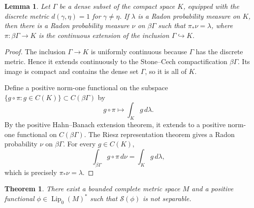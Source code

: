 \documentclass[11pt]{article}
\newtheorem{theorem}{Theorem}
\newtheorem{lemma}{Lemma}
\DeclareMathOperator{\Lip}{Lip}
\newcommand{\SM}{\mathcal S}
\begin{document}
\begin{lemma}\label{lem:lift}
Let \(\Gamma\) be a dense subset of the compact space \(K\), equipped with the
discrete metric \(d(\gamma,\eta)=1\) for \(\gamma\ne\eta\).  If
\(\lambda\) is a Radon probability measure on \(K\), then there is a Radon
probability measure \(\nu\) on \(\beta\Gamma\) such that
\(\pi_*\nu=\lambda\), where
\(\pi:\beta\Gamma\to K\) is the continuous extension of the inclusion
\(\Gamma\hookrightarrow K\).
\end{lemma}

\begin{proof}
The inclusion \(\Gamma\to K\) is uniformly continuous because \(\Gamma\) has
the discrete metric.  Hence it extends continuously to the Stone--Cech
compactification \(\beta\Gamma\).  Its image is compact and contains the dense
set \(\Gamma\), so it is all of \(K\).

Define a positive norm-one functional on the subspace
\(\{g\circ\pi:g\in C(K)\}\subset C(\beta\Gamma)\) by
\[
        g\circ\pi\longmapsto \int_K g\,d\lambda .
\]
By the positive Hahn--Banach extension theorem, it extends to a positive
norm-one functional on \(C(\beta\Gamma)\).  The Riesz representation theorem
gives a Radon probability \(\nu\) on \(\beta\Gamma\).  For every
\(g\in C(K)\),
\[
        \int_{\beta\Gamma} g\circ\pi\,d\nu=\int_K g\,d\lambda,
\]
which is precisely \(\pi_*\nu=\lambda\).
\end{proof}

\begin{theorem}\label{thm:counterexample}
There exist a bounded complete metric space \(M\) and a positive functional
\(\phi\in\Lip_0(M)^*\) such that \(\SM(\phi)\) is not separable.
\end{theorem}
\end{document}

